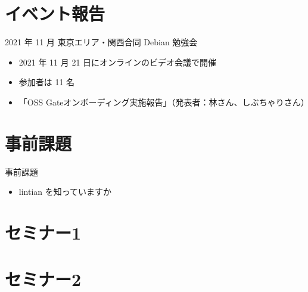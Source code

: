 \section{イベント報告}

\begin{frame}{2021 年 11 月 東京エリア・関西合同 Debian 勉強会}
\begin{itemize}
\item 2021 年 11 月 21 日にオンラインのビデオ会議で開催
\item 参加者は 11 名
\item 「OSS Gateオンボーディング実施報告」（発表者：林さん、しぶちゃりさん）
\end{itemize}
\end{frame}

\section{事前課題}

\begin{frame}{事前課題}
  \begin{itemize}
  \item lintian を知っていますか
  \end{itemize}
\end{frame}

{\footnotesize
  
}

%

\section{セミナー1}

\section{セミナー2}



